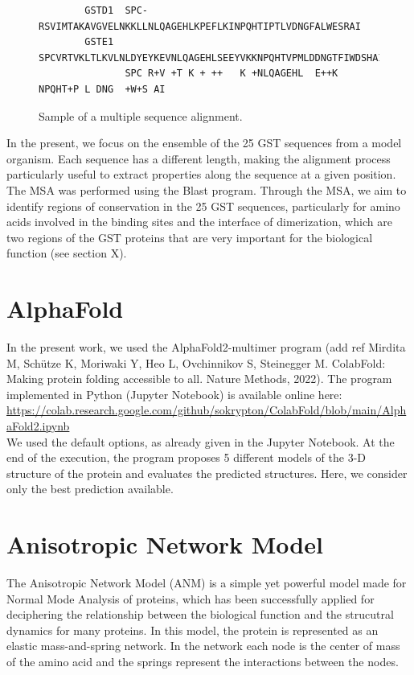 \begin{figure}[h!]
	\begin{verbatim}
		GSTD1  SPC-RSVIMTAKAVGVELNKKLLNLQAGEHLKPEFLKINPQHTIPTLVDNGFALWESRAI
		GSTE1  SPCVRTVKLTLKVLNLDYEYKEVNLQAGEHLSEEYVKKNPQHTVPMLDDNGTFIWDSHAI
		       SPC R+V +T K + ++   K +NLQAGEHL  E++K NPQHT+P L DNG  +W+S AI
	\end{verbatim}	
	\caption{Sample of a multiple sequence alignment.}
	\label{FIG1}
\end{figure}

In the present, we focus on the ensemble of the 25 GST sequences from a model organism. Each sequence has a different length, making the alignment process particularly useful to extract properties along the sequence at a given position. The MSA was performed using the Blast program. Through the MSA, we aim to identify regions of conservation in the 25 GST sequences, particularly for amino acids involved in the binding sites and the interface of dimerization, which are two regions of the GST proteins that are very important for the biological function (see section X). 

\section{AlphaFold}
In the present work, we used the AlphaFold2-multimer program (add ref Mirdita M, Schütze K, Moriwaki Y, Heo L, Ovchinnikov S, Steinegger M. ColabFold: Making protein folding accessible to all. Nature Methods, 2022). The program implemented in Python (Jupyter Notebook) is available online here:\\

\url{https://colab.research.google.com/github/sokrypton/ColabFold/blob/main/AlphaFold2.ipynb}\\

We used the default options, as already given in the Jupyter Notebook. At the end of the execution, the program proposes 5 different models of the 3-D structure of the protein and evaluates the predicted structures. Here, we consider only the best prediction available.

\section{Anisotropic Network Model}

The Anisotropic Network Model (ANM) is a simple yet powerful model made for Normal Mode Analysis of proteins, which has been successfully applied for deciphering the relationship between the biological function and the strucutral dynamics for many proteins\cite{ANM-COM}. In this model, the protein is represented as an elastic mass-and-spring network. In the network each node is the center of mass of the amino acid and the springs represent the interactions between the nodes. 

